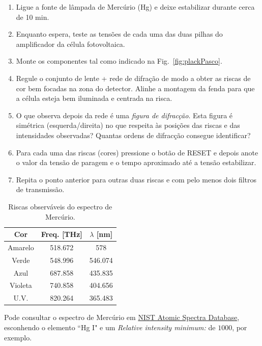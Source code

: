 \documentclass[a4paper,12pt]{article}  %
\begin{document}
\begin{enumerate}
\item Ligue a fonte de lâmpada de Mercúrio (Hg) e deixe estabilizar durante cerca de 10 min.
\item Enquanto espera, teste as tensões de cada uma das duas pilhas do amplificador da célula fotovoltaica.
\item Monte os componentes tal como indicado na Fig.~\ref{fig:plackPasco}.
\item Regule o conjunto de lente + rede de difração de modo a obter as riscas de cor bem focadas na zona do detector. Alinhe a montagem da fenda para que a célula esteja bem iluminada e centrada na risca.
\item O que observa depois da rede é uma \emph{figura de difracção}. 
Esta figura é simétrica (esquerda/direita) no que respeita às posições das riscas e das intensidades observadas? Quantas ordens de difracção consegue identificar?
\item Para cada uma das riscas (cores) pressione o botão de RESET e depois anote o valor da tensão de paragem e o tempo aproximado até a tensão estabilizar.
\item Repita o ponto anterior para outras duas riscas  e com pelo menos dois filtros de transmissão.
\end{enumerate}


\begin{table}[!hbp]
\begin{center}
	\begin{tabular}{|c|c|c|}
	\hline
	Cor  & Freq. [THz] & $\lambda$ [nm]  \\
	\hline
	Amarelo & 518.672 & 578 \\
	Verde & 548.996 & 546.074\\
	Azul & 687.858  & 435.835 \\
	Violeta & 740.858  & 404.656\\
	U.V.    & 820.264  & 365.483 \\
	\hline
 	\end{tabular}
	\caption{Riscas observáveis do espectro de Mercúrio.} 
	\label{tab:Hg}
	\end{center}
\end{table}

Pode consultar o espectro de Mercúrio em  \href{http://physics.nist.gov/asd}{
NIST Atomic Spectra Database}, esconhendo o elemento ``Hg I" e um \emph{Relative intensity minimum:} de $1000$, por exemplo. 	  	



\end{document}

